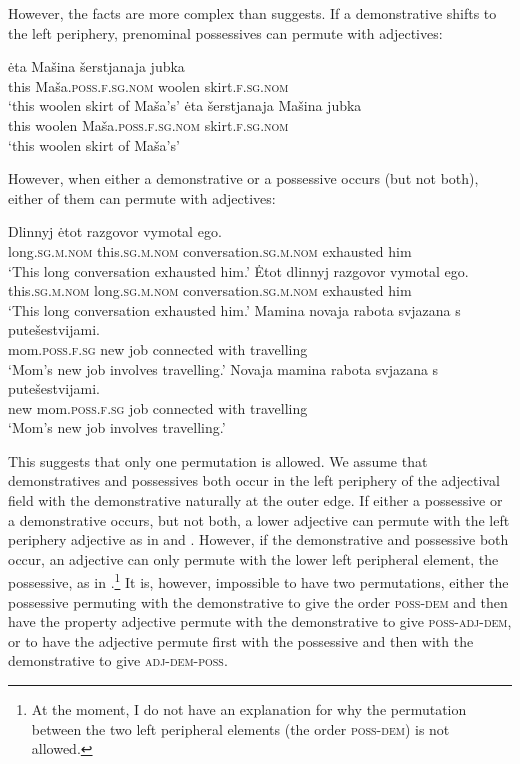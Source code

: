 \documentclass[output=paper]{langscibook}
\begin{document}
\noindent However, the facts are more complex than \citeauthor{Pereltsvaig2007} suggests. If a demonstrative shifts to the left periphery, prenominal possessives can permute with adjectives:


\ea
    \ea \gll ėta Mašina šerstjanaja jubka\label{masinajubka1}\\
    this Maša.\textsc{poss.f.sg.nom} woolen skirt.\textsc{f.sg.nom}\\
    \glt `this woolen skirt of Maša's'
    \ex\label{masinajubka2} \gll ėta šerstjanaja Mašina jubka\\
    this woolen Maša.\textsc{poss.f.sg.nom} skirt.\textsc{f.sg.nom}\\
    \glt `this woolen skirt of Maša's'
\z\z

\noindent However, when either a demonstrative or a possessive occurs (but not both), either of them can permute with adjectives:


\ea\label{razgovor}
    \ea \gll Dlinnyj ėtot razgovor vymotal ego.\\
    long.\textsc{sg.m.nom} this.\textsc{sg.m.nom} conversation.\textsc{sg.m.nom} exhausted him\\
    \glt `This long conversation exhausted him.'
    \ex \gll Ėtot dlinnyj razgovor vymotal ego.\\
    this.\textsc{sg.m.nom} long.\textsc{sg.m.nom} conversation.\textsc{sg.m.nom} exhausted him\\
    \glt `This long conversation exhausted him.'
\z\ex\label{rabota}
    \ea \gll Mamina novaja rabota svjazana s putešestvijami.\\
    mom.\textsc{poss.f.sg} new job connected with travelling\\
    \glt `Mom's new job involves travelling.'
    \ex \gll Novaja mamina rabota svjazana s putešestvijami.\\
    new mom.\textsc{poss.f.sg} job connected with travelling\\
    \glt `Mom's new job involves travelling.'
\z\z

\noindent This suggests that only one permutation is allowed. We assume that demonstratives and possessives both occur in the left periphery of the adjectival field with the demonstrative naturally at the outer edge. If either a possessive or a demonstrative occurs, but not both, a lower adjective can permute with the left periphery adjective as in  and . However, if the demonstrative and possessive both occur, an adjective can only permute with the lower left peripheral element, the possessive, as in .\footnote{At the moment, I do not have an explanation for why the permutation between the two left peripheral elements (the order \textsc{poss-dem}) is not allowed.} It is, however, impossible to have two permutations, either the possessive permuting with the demonstrative to give the order \textsc{poss-dem} and then have the property adjective permute with the demonstrative to give \textsc{poss-adj-dem}, or to have the adjective permute first with the possessive and then with the demonstrative to give \textsc{adj-dem-poss}.
\end{document}
